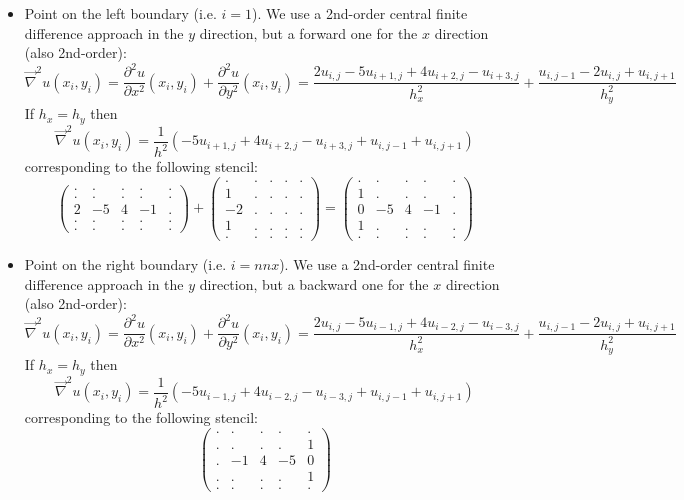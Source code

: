 \begin{itemize}
\item Point on the left boundary (i.e. $i=1$). We use a 2nd-order central finite difference 
approach in the $y$ direction, but a forward one for the $x$ direction (also 2nd-order):
\[
\vec\nabla^2 u (x_i,y_i)= \frac{\partial^2 u}{\partial x^2}(x_i,y_i)+
\frac{\partial^2 u}{\partial y^2}(x_i,y_i)
= 
\frac{2u_{i,j} -5u_{i+1,j} +4u_{i+2,j}-u_{i+3,j}}{h_x^2} + \frac{u_{i,j-1} -2u_{i,j} +u_{i,j+1}}{h_y^2}
\]
If $h_x=h_y$ then
\[
\vec\nabla^2 u (x_i,y_i)= \frac{1}{h^2}
\left(
-5u_{i+1,j} +4u_{i+2,j}-u_{i+3,j} +u_{i,j-1}  +u_{i,j+1}
\right)
\]
corresponding to the following stencil:
\[
\begin{pmatrix}
. & . &  . & . & . \\
. & . &  . & . & . \\
2 &-5 & 4 & -1 &. \\
. & . &  . & . & . \\
. & . &  . & . & . 
\end{pmatrix}
+
\begin{pmatrix}
. & . &  . & . & . \\
1 & . &  . & . & . \\
-2 & . &  . & . & . \\
1 & . &  . & . & . \\
. & . &  . & . & . 
\end{pmatrix}
=
\begin{pmatrix}
. & . &  . & . & . \\
1 & . &  . & . & . \\
0 & -5 & 4 & -1 & . \\
1 & . &  . & . & . \\
. & . &  . & . & . 
\end{pmatrix}
\]


\item Point on the right boundary (i.e. $i=nnx$). We use a 2nd-order central finite difference 
approach in the $y$ direction, but a backward one for the $x$ direction (also 2nd-order):
\[
\vec\nabla^2 u (x_i,y_i)= \frac{\partial^2 u}{\partial x^2}(x_i,y_i)+
\frac{\partial^2 u}{\partial y^2}(x_i,y_i)
= 
\frac{2u_{i,j} -5u_{i-1,j} +4u_{i-2,j}-u_{i-3,j}}{h_x^2} + \frac{u_{i,j-1} -2u_{i,j} +u_{i,j+1}}{h_y^2}
\]
If $h_x=h_y$ then
\[
\vec\nabla^2 u (x_i,y_i)= \frac{1}{h^2}
\left(
-5u_{i-1,j} +4u_{i-2,j}-u_{i-3,j} +u_{i,j-1}  +u_{i,j+1}
\right)
\]
corresponding to the following stencil:
\[
\begin{pmatrix}
. & . &  . & . & . \\
. & . &  . & . & 1 \\
. & -1 & 4 & -5 & 0 \\
. & . &  . & . & 1 \\
. & . &  . & . & . 
\end{pmatrix}
\]


\end{itemize}
